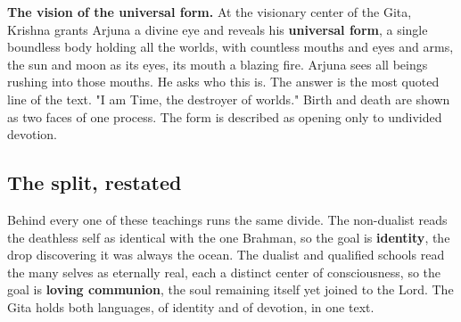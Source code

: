 \textbf{The vision of the universal form.} At the visionary center of the Gita, Krishna grants Arjuna a divine eye and reveals his \textbf{universal form}, a single boundless body holding all the worlds, with countless mouths and eyes and arms, the sun and moon as its eyes, its mouth a blazing fire. Arjuna sees all beings rushing into those mouths. He asks who this is. The answer is the most quoted line of the text. "I am Time, the destroyer of worlds." Birth and death are shown as two faces of one process. The form is described as opening only to undivided devotion.

\subsection{The split, restated}

Behind every one of these teachings runs the same divide. The non-dualist reads the deathless self as identical with the one Brahman, so the goal is \textbf{identity}, the drop discovering it was always the ocean. The dualist and qualified schools read the many selves as eternally real, each a distinct center of consciousness, so the goal is \textbf{loving communion}, the soul remaining itself yet joined to the Lord. The Gita holds both languages, of identity and of devotion, in one text.
